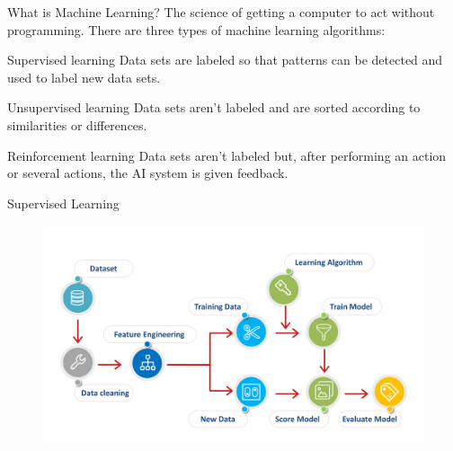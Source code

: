 \begin{frame}{What is Machine Learning?}
    The science of getting a computer to act without programming. There are three types of machine learning algorithms:

    \pause

    \begin{block}{Supervised learning}
        Data sets are labeled so that patterns can be detected and used to label new data sets.
    \end{block}

    \pause

    \begin{block}{Unsupervised learning}
        Data sets aren't labeled and are sorted according to similarities or differences.
    \end{block}

    \pause

    \begin{block}{Reinforcement learning}
        Data sets aren't labeled but, after performing an action or several actions, the AI system is given feedback.
    \end{block}
\end{frame}

\begin{frame}{Supervised Learning}
    \begin{figure}
        \includegraphics[width=\textwidth]{img/training-process.png}
    \end{figure}
\end{frame}

